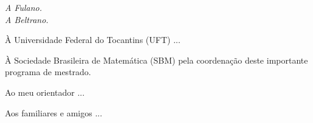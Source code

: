 
\imprimircapa


\imprimirfolhaderosto





\begin{fichacatalografica}
    
\end{fichacatalografica}







\begin{dedicatoria}
\vspace*{\fill}
	\begin{flushright}
		\textit{
            A Fulano.\\
   		   A Beltrano.
        }
	\end{flushright}
\end{dedicatoria}


\begin{agradecimentos}

À Universidade Federal do Tocantins (UFT) ...

À Sociedade Brasileira de Matemática (SBM) pela coordenação deste importante programa de mestrado.

Ao meu orientador ...

Aos familiares e amigos ...

\end{agradecimentos}


